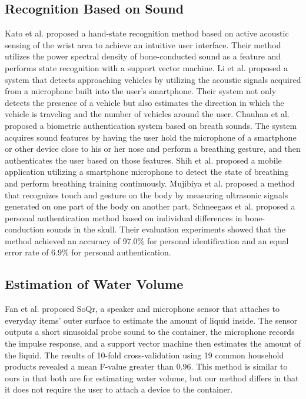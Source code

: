 \documentclass[sigconf,authordraft]{acmart}
\begin{document}
\subsection{Recognition Based on Sound}
Kato et al. \cite{sound_sensing1} proposed a hand-state recognition method based on active acoustic sensing of the wrist area to achieve an intuitive user interface. Their method utilizes the power spectral density of bone-conducted sound as a feature and performs state recognition with a support vector machine.
Li et al. \cite{Auto++} proposed a system that detects approaching vehicles by utilizing the acoustic signals acquired from a microphone built into the user's smartphone. Their system not only detects the presence of a vehicle but also estimates the direction in which the vehicle is traveling and the number of vehicles around the user.
Chauhan et al. \cite{BreathPrint} proposed a biometric authentication system based on breath sounds. The system acquires sound features by having the user hold the microphone of a smartphone or other device close to his or her nose and perform a breathing gesture, and then authenticates the user based on those features.
Shih et al. \cite{Breeze} proposed a mobile application utilizing a smartphone microphone to detect the state of breathing and perform breathing training continuously.
Mujibiya et al. \cite{sound_sensing2} proposed a method that recognizes touch and gesture on the body by measuring ultrasonic signals generated on one part of the body on another part.
Schneegass et al. \cite{SkullConduct} proposed a personal authentication method based on individual differences in bone-conduction sounds in the skull. Their evaluation experiments showed that the method achieved an accuracy of 97.0\% for personal identification and an equal error rate of 6.9\% for personal authentication.


\subsection{Estimation of Water Volume}
Fan et al. \cite{SoQr} proposed SoQr, a speaker and microphone sensor that attaches to everyday items' outer surface to estimate the amount of liquid inside. The sensor outputs a short sinusoidal probe sound to the container, the microphone records the impulse response, and a support vector machine then estimates the amount of the liquid. The results of 10-fold cross-validation using 19 common household products revealed a mean F-value greater than 0.96.
This method is similar to ours in that both are for estimating water volume, but our method differs in that it does not require the user to attach a device to the container.
\end{document}
